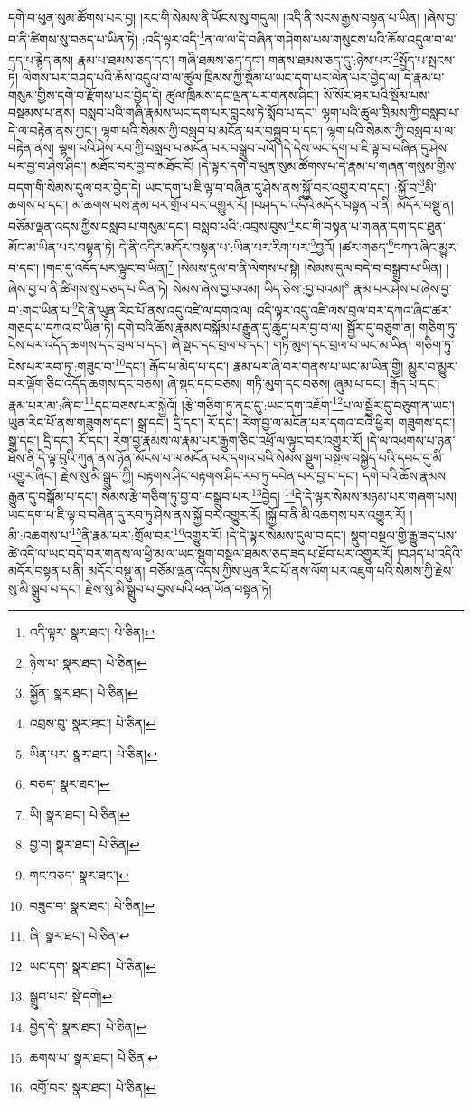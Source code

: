 དགེ་བ་ཕུན་སུམ་ཚོགས་པར་བྱ། །རང་གི་སེམས་ནི་ཡོངས་སུ་གདུལ། །འདི་ནི་སངས་རྒྱས་བསྟན་པ་ཡིན། །ཞེས་བྱ་བ་ནི་ཚིགས་སུ་བཅད་པ་ཡིན་ཏེ། :འདི་ལྟར་འདི་\footnote{འདི་ལྟར་  སྣར་ཐང་།  པེ་ཅིན། }ན་ལ་ལ་དེ་བཞིན་གཤེགས་པས་གསུངས་པའི་ཆོས་འདུལ་བ་ལ་དད་པ་རྙེད་ནས། རྣམ་པ་ཐམས་ཅད་དང་། གཞི་ཐམས་ཅད་དང་། གནས་ཐམས་ཅད་དུ་:ཉེས་པར་\footnote{ཉེས་པ་  སྣར་ཐང་།  པེ་ཅིན། }སྤྱོད་པ་སྤངས་ཏེ། ལེགས་པར་བཤད་པའི་ཆོས་འདུལ་བ་ལ་ཚུལ་ཁྲིམས་ཀྱི་སྡོམ་པ་ཡང་དག་པར་ལེན་པར་བྱེད་ལ། དེ་རྣམ་པ་གསུམ་གྱིས་དགེ་བ་རྫོགས་པར་བྱེད་དེ། ཚུལ་ཁྲིམས་དང་ལྡན་པར་གནས་ཤིང་། སོ་སོར་ཐར་པའི་སྡོམ་པས་བསྡམས་པ་ནས། བསླབ་པའི་གཞི་རྣམས་ཡང་དག་པར་བླངས་ཏེ་སློབ་པ་དང་། ལྷག་པའི་ཚུལ་ཁྲིམས་ཀྱི་བསླབ་པ་དེ་ལ་བརྟེན་ནས་ཀྱང་། ལྷག་པའི་སེམས་ཀྱི་བསླབ་པ་མངོན་པར་བསྒྲུབ་པ་དང་། ལྷག་པའི་སེམས་ཀྱི་བསླབ་པ་ལ་བརྟེན་ནས། ལྷག་པའི་ཤེས་རབ་ཀྱི་བསླབ་པ་མངོན་པར་བསྒྲུབ་པའོ། །དེ་དེས་ཡང་དག་པ་ཇི་ལྟ་བ་བཞིན་དུ་ཤེས་པར་བྱ་བ་ཤེས་ཤིང་། མཐོང་བར་བྱ་བ་མཐོང་ངོ། །དེ་ལྟར་དགེ་བ་ཕུན་སུམ་ཚོགས་པ་དེ་རྣམ་པ་གཞན་གསུམ་གྱིས་བདག་གི་སེམས་དུལ་བར་བྱེད་དེ། ཡང་དག་པ་ཇི་ལྟ་བ་བཞིན་དུ་ཤེས་ནས་སྐྱོ་བར་འགྱུར་བ་དང་། :སྐྱོ་བ་\footnote{སྐྱོན་  སྣར་ཐང་།  པེ་ཅིན། }མི་ཆགས་པ་དང་། མ་ཆགས་པས་རྣམ་པར་གྲོལ་བར་འགྱུར་རོ། །བཤད་པ་འདིའི་མདོར་བསྟན་པ་ནི། མདོར་བསྡུ་ན། བཅོམ་ལྡན་འདས་ཀྱིས་བསླབ་པ་གསུམ་དང་། བསླབ་པའི་:འབྲས་བུས་\footnote{འབྲས་བུ་  སྣར་ཐང་།  པེ་ཅིན། }རང་གི་བསྟན་པ་གཞན་དག་དང་ཐུན་མོང་མ་ཡིན་པར་བསྟན་ཏེ། དེ་ནི་འདིར་མདོར་བསྟན་པ་:ཡིན་པར་རིག་པར་\footnote{ཡིན་པར་  སྣར་ཐང་།  པེ་ཅིན། }བྱའོ། །ཚར་གཅད་\footnote{བཅད་  སྣར་ཐང་། }དཀའ་ཞིང་མྱུར་བ་དང་། །གང་དུ་འདོད་པར་ལྟུང་བ་ཡིན།\footnote{ཡི།  སྣར་ཐང་།  པེ་ཅིན། } །སེམས་དུལ་བ་ནི་ལེགས་པ་སྟེ། །སེམས་དུལ་བདེ་བ་བསྒྲུབ་པ་ཡིན། །ཞེས་བྱ་བ་ནི་ཚིགས་སུ་བཅད་པ་ཡིན་ཏེ། སེམས་ཞེས་བྱ་བའམ། ཡིད་ཅེས་:བྱ་བའམ།\footnote{བྱ་བ།  སྣར་ཐང་།  པེ་ཅིན། } རྣམ་པར་ཤེས་པ་ཞེས་བྱ་བ་:གང་ཡིན་པ་\footnote{གང་བཅད་  སྣར་ཐང་། }དེ་ནི་ཡུན་རིང་པོ་ནས་འདུ་འཛི་ལ་དགའ་ལ། འདི་ལྟར་འདུ་འཛི་ལས་བྲལ་བར་དཀའ་ཞིང་ཚར་གཅད་པ་དཀའ་བ་ཡིན་ཏེ། དགེ་བའི་ཆོས་རྣམས་བསྒོམ་པ་རྒྱུན་དུ་ཆུད་པར་བྱ་བ་ལ། སྦྱོར་དུ་བཅུག་ན། གཅིག་ཏུ་ངེས་པར་འདོད་ཆགས་དང་བྲལ་བ་དང་། ཞེ་སྡང་དང་བྲལ་བ་དང་། གཏི་མུག་དང་བྲལ་བ་ཡང་མ་ཡིན། གཅིག་ཏུ་ངེས་པར་རབ་ཏུ་:གཟུང་བ་\footnote{བཟུང་བ་  སྣར་ཐང་།  པེ་ཅིན། }དང་། རྒོད་པ་མེད་པ་དང་། རྣམ་པར་ཞི་བར་གནས་པ་ཡང་མ་ཡིན་གྱི། མྱུར་བ་མྱུར་བར་ལྡོག་ཅིང་འདོད་ཆགས་དང་བཅས། ཞེ་སྡང་དང་བཅས། གཏི་མུག་དང་བཅས། ཞུམ་པ་དང་། རྒོད་པ་དང་། རྣམ་པར་མ་:ཞི་བ་\footnote{ཞི་  སྣར་ཐང་།  པེ་ཅིན། }དང་བཅས་པར་སྐྱེའོ། །རྩེ་གཅིག་ཏུ་ནང་དུ་:ཡང་དག་འཇོག་\footnote{ཡང་དག་  སྣར་ཐང་།  པེ་ཅིན། }པ་ལ་སྦྱོར་དུ་བཅུག་ན་ཡང་། ཡུན་རིང་པོ་ནས་གཟུགས་དང་། སྒྲ་དང་། དྲི་དང་། རོ་དང་། རེག་བྱ་ལ་མངོན་པར་དགའ་བའི་ཕྱིར། གཟུགས་དང་། སྒྲ་དང་། དྲི་དང་། རོ་དང་། རེག་བྱ་རྣམས་ལ་རྣམ་པར་རྒྱུག་ཅིང་འཕྲོ་ལ་ལྟུང་བར་འགྱུར་རོ། །དེ་ལ་འཕགས་པ་ཉན་ཐོས་ནི་དེ་ལྟ་བུའི་ཀུན་ནས་ཉོན་མོངས་པ་ལ་མངོན་པར་དགའ་བའི་སེམས་སྡུག་བསྔལ་བསྐྱེད་པའི་དབང་དུ་མི་འགྱུར་ཞིང་། རྗེས་སུ་མི་སྒྲུབ་ཀྱི། བརྟགས་ཤིང་བརྟགས་ཤིང་རབ་ཏུ་དབེན་པར་བྱ་བ་དང་། དགེ་བའི་ཆོས་རྣམས་རྒྱུན་དུ་བསྒོམ་པ་དང་། སེམས་རྩེ་གཅིག་ཏུ་བྱ་བ་:བསྒྲུབ་པར་\footnote{སྒྲུབ་པར་  སྡེ་དགེ། }བྱེད། \footnote{བྱེད་དེ་  སྣར་ཐང་།  པེ་ཅིན། }དེ་དེ་ལྟར་སེམས་མཉམ་པར་གཞག་པས། ཡང་དག་པ་ཇི་ལྟ་བ་བཞིན་དུ་རབ་ཏུ་ཤེས་ནས་སྐྱོ་བར་འགྱུར་རོ། །སྐྱོ་བ་ནི་མི་འཆགས་པར་འགྱུར་རོ། །མི་:འཆགས་པ་\footnote{ཆགས་པ་  སྣར་ཐང་།  པེ་ཅིན། }ནི་རྣམ་པར་:གྲོལ་བར་\footnote{འགྲོ་བར་  སྣར་ཐང་།  པེ་ཅིན། }འགྱུར་རོ། །དེ་དེ་ལྟར་སེམས་དུལ་བ་དང་། སྡུག་བསྔལ་གྱི་རྒྱུ་ཟད་པས་ཚེ་འདི་ལ་ཡང་བདེ་བར་གནས་ལ་ཕྱི་མ་ལ་ཡང་སྡུག་བསྔལ་ཐམས་ཅད་ཟད་པ་ཐོབ་པར་འགྱུར་རོ། །བཤད་པ་འདིའི་མདོར་བསྟན་པ་ནི། མདོར་བསྡུ་ན། བཅོམ་ལྡན་འདས་ཀྱིས་ཡུན་རིང་པོ་ནས་ལོག་པར་འཇུག་པའི་སེམས་ཀྱི་རྗེས་སུ་མི་སྒྲུབ་པ་དང་། རྗེས་སུ་མི་སྒྲུབ་པ་བྱས་པའི་ཕན་ཡོན་བསྟན་ཏེ། 
